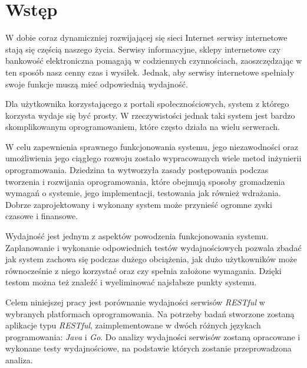 \chapter{Wstęp}

W dobie coraz dynamiczniej rozwijającej się sieci Internet serwisy internetowe stają się częścią  naszego życia. Serwisy informacyjne, sklepy internetowe czy bankowość elektroniczna pomagają w codziennych czynnościach,  zaoszczędzając w ten sposób nasz cenny czas i wysiłek. Jednak, aby  serwisy internetowe spełniały swoje funkcje muszą  mieć odpowiednią wydajność. 

Dla użytkownika korzystającego z portali społecznościowych, system z którego korzysta wydaje się być prosty. W rzeczywistości jednak taki system jest bardzo skomplikowanym oprogramowaniem, które często działa na wielu serwerach.

W celu zapewnienia sprawnego funkcjonowania  systemu, jego niezawodności oraz umożliwienia jego ciągłego rozwoju zostało wypracowanych wiele metod inżynierii oprogramowania. Dziedzina ta wytworzyła zasady postępowania podczas tworzenia i rozwijania oprogramowania, które obejmują sposoby gromadzenia wymagań o systemie, jego implementacji, testowania jak również wdrażania. Dobrze zaprojektowany i wykonany system może przynieść ogromne zyski czasowe i finansowe. 

Wydajność jest jednym z aspektów powodzenia funkcjonowania systemu. Zaplanowanie i wykonanie odpowiednich testów wydajnościowych pozwala zbadać jak system zachowa się podczas dużego obciążenia, jak dużo użytkowników może równocześnie z niego korzystać oraz czy spełnia założone wymagania. Dzięki testom można też znaleźć i wyeliminować najsłabsze punkty systemu.

Celem niniejszej pracy jest  porównanie wydajności serwisów  \textsl{RESTful} w wybranych platformach oprogramowania. Na potrzeby badań  stworzone zostaną aplikacje typu \textsl{RESTful}, zaimplementowane  w dwóch różnych językach programowania: \textsl{Java} i \textsl{Go}. Do analizy wydajności serwisów zostaną opracowane i wykonane testy wydajnościowe, na podstawie których zostanie przeprowadzona analiza.
